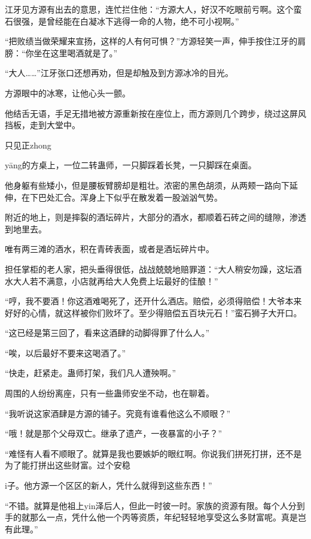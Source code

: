 
\begin{this_body}

江牙见方源有出去的意思，连忙拦住他：“方源大人，好汉不吃眼前亏啊。这个蛮石很强，是曾经能在白凝冰下逃得一命的人物，绝不可小视啊。”

“把败绩当做荣耀来宣扬，这样的人有何可惧？”方源轻笑一声，伸手按住江牙的肩膀：“你坐在这里喝酒就是了。”

“大人……”江牙张口还想再劝，但是却触及到方源冰冷的目光。

方源眼中的冰寒，让他心头一颤。

他结舌无语，手足无措地被方源重新按在座位上，而方源则几个跨步，绕过这屏风挡板，走到大堂中。

只见正zhong

yāng的方桌上，一位二转蛊师，一只脚踩着长凳，一只脚踩在桌面。

他身躯有些矮小，但是腰板臂膀却是粗壮。浓密的黑色胡须，从两颊一路向下延伸，在下巴处汇合。浑身上下似乎在散发着一股汹汹气势。

附近的地上，则是摔裂的酒坛碎片，大部分的酒水，都顺着石砖之间的缝隙，渗透到地里去。

唯有两三滩的酒水，积在青砖表面，或者是酒坛碎片中。

担任掌柜的老人家，把头垂得很低，战战兢兢地赔罪道：“大人稍安勿躁，这坛酒水大人若不满意，小店就再给大人免费上坛最好的佳酿！”

“哼，我不要酒！你这酒难喝死了，还开什么酒店。赔偿，必须得赔偿！大爷本来好好的心情，就这样被你们败坏了。至少得赔偿五百块元石！”蛮石狮子大开口。

“这已经是第三回了，看来这酒肆的动脚得罪了什么人。”

“唉，以后最好不要来这喝酒了。”

“快走，赶紧走。蛊师打架，我们凡人遭殃啊。”

周围的人纷纷离座，只有一些蛊师安坐不动，也在聊着。

“我听说这家酒肆是方源的铺子。究竟有谁看他这么不顺眼？”

“哦！就是那个父母双亡。继承了遗产，一夜暴富的小子？”

“难怪有人看不顺眼了。就算是我也要嫉妒的眼红啊。你说我们拼死打拼，还不是为了能打拼出这些财富。过个安稳

i子。他方源一个区区的新人，凭什么就得到这些东西！”

“不错。就算是他祖上yin泽后人，但此一时彼一时。家族的资源有限。每个人分到手的就那么一点，凭什么他一个丙等资质，年纪轻轻地享受这么多财富呢。真是岂有此理。”


\end{this_body}
